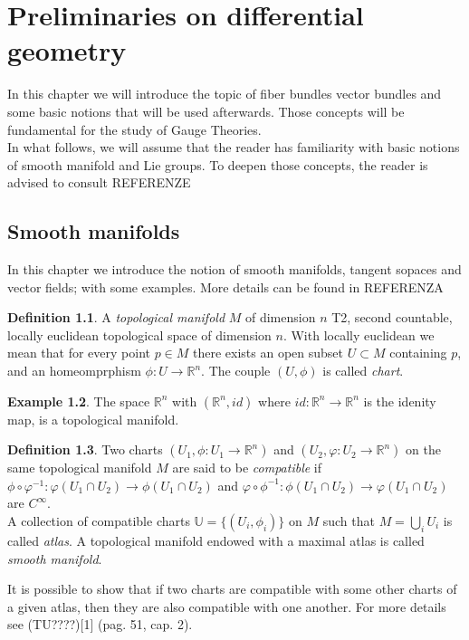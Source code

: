 \documentclass[12pt,a4paper]{report}
\theoremstyle{definition}
\newtheorem{Def}{Definition}[chapter]
\theoremstyle{Theorem}
\theoremstyle{definition}
\newtheorem{Ex}[Def]{Example}
\theoremstyle{definition}
\begin{document}
	\chapter{Preliminaries on differential geometry}
		In this chapter we will introduce the topic of fiber bundles vector bundles and some basic notions that will be used afterwards. Those concepts will be fundamental for the study of Gauge Theories.\\
		In what follows, we will assume that the reader has familiarity with basic notions of smooth manifold and Lie groups. To deepen those concepts, the reader is advised to consult REFERENZE
		\section{Smooth manifolds}
		In this chapter we introduce the notion of smooth manifolds, tangent sopaces and vector fields; with some examples. More details can be found in REFERENZA
		\begin{Def}
			A \textit{topological manifold} $M$ of dimension $n$ T2, second countable, locally euclidean topological space of dimension $n$. With locally euclidean we mean that for every point $p\in M$ there exists an open subset $U\subset M$ containing $p$, and an homeomprphism $\phi:U\rightarrow\mathbb{R}^n$. The couple $(U,\phi)$ is called \textit{chart}. 
		\end{Def}
		\begin{Ex}
			The space $\mathbb{R}^n$ with $(\mathbb{R}^n, id)$ where $id:\mathbb{R}^n\rightarrow \mathbb{R}^n$ is the idenity map, is a topological manifold. 
		\end{Ex}
		\begin{Def}
			Two charts $(U_1,\phi:U_1\rightarrow\mathbb{R}^n)$ and $(U_2,\varphi:U_2\rightarrow\mathbb{R}^n)$ on the same topological manifold $M$ are said to be \textit{compatible} if
			$\phi\circ\varphi^{-1}:\varphi(U_1\cap U_2)\rightarrow \phi(U_1\cap U_2)$ and $\varphi\circ\phi^{-1}:\phi(U_1\cap U_2)\rightarrow \varphi(U_1\cap U_2)$ are $C^\infty$.\\
			A collection of compatible charts $\mathbb{U}=\{(U_i,\phi_{i})\}$ on $M$ such that $M=\bigcup_i U_i$ is called \textit{atlas}. A topological manifold endowed with a maximal atlas is called \textit{smooth manifold}.
		\end{Def}
		It is possible to show that if two charts are compatible with some other charts of a given atlas, then they are also compatible with one another. For more details see (TU????)[1] (pag. 51, cap. 2).
\end{document}
